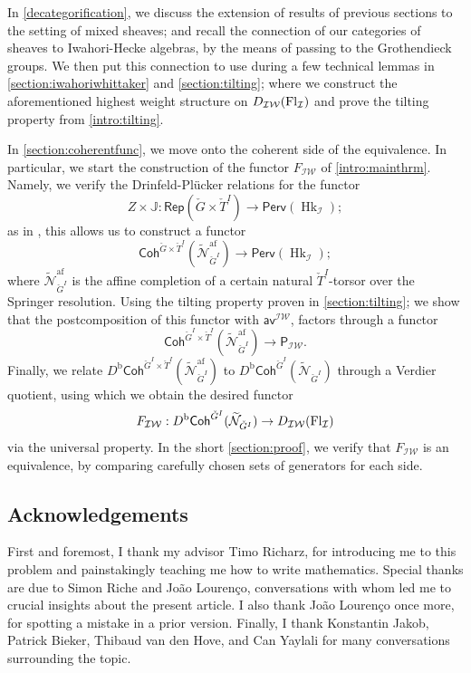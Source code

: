 \documentclass{amsart}
\let\x\times
\newcommand{\Perv}{\mathsf{Perv}}
\newcommand{\Rep}{\mathsf{Rep}}
\newcommand{\Coh}{\mathsf{Coh}}
\newcommand{\Db}{D^{\mathrm{b}}}
\newcommand{\Hk}[1]{\ensuremath{\operatorname{Hk}_{#1}}}
\newcommand{\I}{\mathcal{I}}
\newcommand{\PIW}{\mathsf{P}_{\mathcal{IW}}}
\newcommand{\IW}{\mathcal{IW}}
\newcommand{\aviw}{\mathsf{av}^\mathcal{IW}}
\newcommand{\DIW}{D_{\mathcal{IW}}(\Fl{\I})}
\newcommand{\Sprgi}{\widetilde{\mathcal{N}}_{\check G^I}}
\newcommand{\Sprgafi}{\widetilde{\mathcal{N}}^\mathrm{af}_{{\check G}^I}}
\newcommand{\Fl}[2][]{%
  \ifblank{#1}{
    \operatorname{Fl}_{#2}}
  {
    \operatorname{Fl}_{#1,#2}}}
\numberwithin{equation}{section}
\theoremstyle{definition}
\theoremstyle{remark}
\begin{document}
In \cref{decategorification}, we discuss the extension of results of previous sections to the
setting of mixed sheaves; and recall the connection of our categories of sheaves to
Iwahori-Hecke algebras, by the means of passing to the Grothendieck groups. We then
 put this connection to use during a few technical lemmas in \cref{section:iwahoriwhittaker} and
 \cref{section:tilting}; where we construct the aforementioned highest weight structure on $\DIW$ and
 prove the tilting property from \cref{intro:tilting}.

In \cref{section:coherentfunc}, we move onto the coherent side of the equivalence.
In particular, we start the construction of the functor $F_\IW$ of \cref{intro:mainthrm}.
Namely, we verify the Drinfeld-Pl\"ucker relations for the functor
$$Z\x\mathbb{J}:\Rep(\check G\x\check T^I)\rightarrow \Perv(\Hk{\I});$$
as in \cite[Section 3]{arkhipovBezrukavnikov},
this allows us to construct a functor
$$\Coh^{\check G\x\check T^I}(\Sprgafi)\rightarrow \Perv(\Hk{\I});$$
where $\Sprgafi$ is the affine completion of a certain natural $\check T^I$-torsor over the Springer resolution. Using the
tilting property proven in \cref{section:tilting}; we show that the postcomposition of this functor
with $\aviw$, factors through a functor
$$\Coh^{\check G^I\x\check T^I}(\Sprgafi)\rightarrow \PIW.$$
Finally, we relate $\Db\Coh^{\check G^I\x\check T^I}(\Sprgafi)$ to $\Db\Coh^{\check
G^I}(\Sprgi)$ through a Verdier quotient, using which we obtain the desired functor
$$F_\IW:\Db\Coh^{\check G^I}(\Sprgi)\rightarrow \DIW$$
via the universal property. In the short \cref{section:proof}, we verify that $F_\IW$ is an
equivalence, by comparing carefully chosen sets of generators for each side.
\subsection*{Acknowledgements}
First and foremost, I thank my advisor Timo Richarz, for introducing me to this problem and
painstakingly teaching me how to write mathematics. Special thanks are due to Simon
Riche and Jo{\~a}o Louren{\c c}o, conversations with whom led me to crucial insights about the
present article. I also thank Jo{\~a}o Louren{\c c}o once more, for spotting a mistake in a
prior version. Finally, I
thank Konstantin Jakob, Patrick Bieker, Thibaud van den Hove, and Can Yaylali for many
conversations surrounding the topic.






\printbibliography
\end{document}
